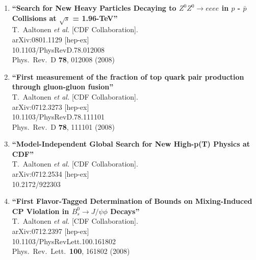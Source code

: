 \documentclass{article}
\begin{document}
\begin{enumerate}
\item%
{\bf ``Search for New Heavy Particles Decaying to $Z^0 Z^0 \to eeee$ in $p$ - $\bar{p}$ Collisions at $\sqrt{s}$ = 1.96-TeV''}
  \\{}T.~Aaltonen {\it et al.}  [CDF Collaboration].
  \\{}arXiv:0801.1129 [hep-ex]
    \\{}10.1103/PhysRevD.78.012008
\\{}Phys.\ Rev.\ D {\bf 78}, 012008 (2008) %


\item%
{\bf ``First measurement of the fraction of top quark pair production through gluon-gluon fusion''}
  \\{}T.~Aaltonen {\it et al.}  [CDF Collaboration].
  \\{}arXiv:0712.3273 [hep-ex]
    \\{}10.1103/PhysRevD.78.111101
\\{}Phys.\ Rev.\ D {\bf 78}, 111101 (2008) %


\item%
{\bf ``Model-Independent Global Search for New High-p(T) Physics at CDF''}
  \\{}T.~Aaltonen {\it et al.}  [CDF Collaboration].
  \\{}arXiv:0712.2534 [hep-ex]
    \\{}10.2172/922303


\item%
{\bf ``First Flavor-Tagged Determination of Bounds on Mixing-Induced CP Violation in $B^0_{s} \to J/\psi \phi$ Decays''}
  \\{}T.~Aaltonen {\it et al.}  [CDF Collaboration].
  \\{}arXiv:0712.2397 [hep-ex]
    \\{}10.1103/PhysRevLett.100.161802
\\{}Phys.\ Rev.\ Lett.\  {\bf 100}, 161802 (2008) %



\end{enumerate}
\end{document}
